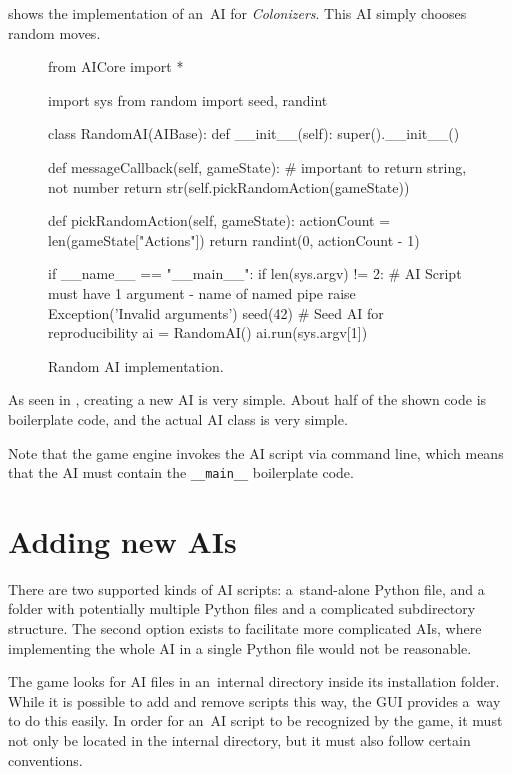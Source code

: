 \clearpage
{} shows the implementation of an~AI for \emph{Colonizers}.
This AI simply chooses random moves.

\begin{figure}[h!]
\begin{code}[commandchars=\\\{\},codes={\catcode`\$=3\catcode`\^=7\catcode`\_=8}]
from AICore import *

import sys
from random import seed, randint

class RandomAI(AIBase):
    def \_\_init\_\_(self):
        super().\_\_init\_\_()

    def messageCallback(self, gameState):
        # important to return string, not number
        return str(self.pickRandomAction(gameState))

    def pickRandomAction(self, gameState):
        actionCount = len(gameState["Actions"])
        return randint(0, actionCount - 1)

if \_\_name\_\_ == "\_\_main\_\_":
    if len(sys.argv) != 2:
        # AI Script must have 1 argument - name of named pipe
        raise Exception('Invalid arguments')
    seed(42) # Seed AI for reproducibility
    ai = RandomAI()
    ai.run(sys.argv[1])
\end{code}
\caption{Random AI implementation.}\label{framework:randomai}
\end{figure}

As seen in , creating a new AI is very simple.
About half of the shown code is boilerplate code, and the actual AI
class is very simple.

Note that the game engine invokes the AI script via command line, which
means that the AI must contain the \texttt{\_\_main\_\_} boilerplate code.

\section{Adding new AIs}

There are two supported kinds of AI scripts: a~stand-alone Python file,
and a folder with potentially multiple Python files and a complicated subdirectory
structure. The second option exists to facilitate more complicated AIs, where
implementing the whole AI in a single Python file would not be reasonable.

The game looks for AI files in an~internal directory inside its installation folder.
While it is possible to add and remove scripts this way, the GUI provides a~way
to do this easily. In order for an~AI script to be recognized by the game, it must not
only be located in the internal directory, but it must also follow certain conventions.

